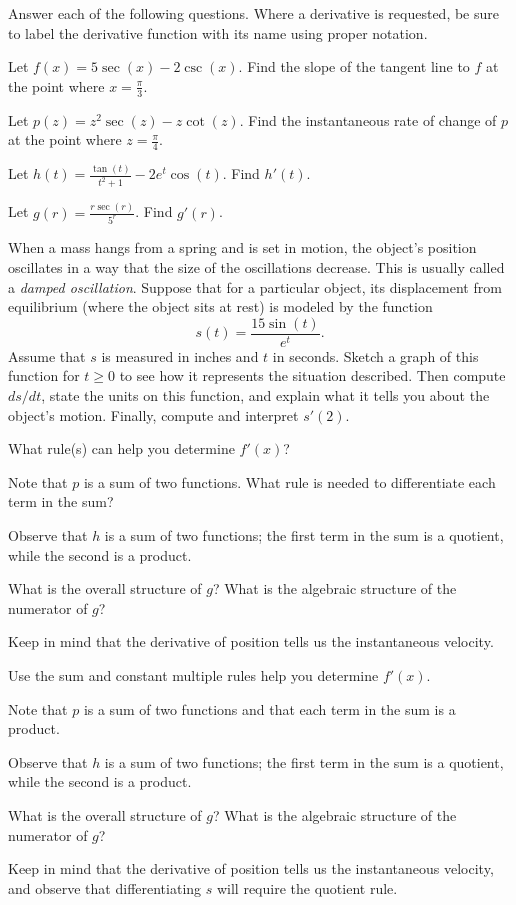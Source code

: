 \begin{activity} \label{A:2.5.7}  Answer each of the following questions.  Where a derivative is requested, be sure to label the derivative function with its name using proper notation.
\ba
	\item  Let $f(x) = 5 \sec(x) - 2\csc(x)$.  Find the slope of the tangent line to $f$ at the point where $x =\frac{\pi}{3}$.
	\item Let $p(z) = z^2\sec(z) - z\cot(z)$.  Find the instantaneous rate of change of $p$ at the point where $z = \frac{\pi}{4}$.
        \item Let $h(t) = \displaystyle \frac{\tan (t)}{t^2+1} - 2e^t \cos(t)$.  Find $h'(t)$.
        \item Let $g(r) = \displaystyle \frac{r \sec(r) }{5^r}$.  Find $g'(r)$.
        \item When a mass hangs from a spring and is set in motion, the object's position oscillates in a way that the size of the oscillations decrease.  This is usually called a \emph{damped oscillation}.  Suppose that for a particular object, its displacement from equilibrium (where the object sits at rest) is modeled by the function $$s(t) = \frac{15 \sin(t)}{e^t}.$$
Assume that $s$ is measured in inches and $t$ in seconds.  Sketch a graph of this function for $t \ge 0$ to see how it represents the situation described.  Then compute $ds/dt$, state the units on this function, and explain what it tells you about the object's motion.  Finally, compute and interpret $s'(2)$.
\ea
\end{activity}
\begin{smallhint}
\ba
	\item  What rule(s) can help you determine $f'(x)$?
	\item Note that $p$ is a sum of two functions.  What rule is needed to differentiate each term in the sum?
	\item Observe that $h$ is a sum of two functions; the first term in the sum is a quotient, while the second is a product.
        \item What is the overall structure of $g$?  What is the algebraic structure of the numerator of $g$?
        \item Keep in mind that the derivative of position tells us the instantaneous velocity.
\ea
\end{smallhint}
\begin{bighint}
\ba
	\item Use the sum and constant multiple rules help you determine $f'(x)$.
	\item Note that $p$ is a sum of two functions and that each term in the sum is a product.
	\item Observe that $h$ is a sum of two functions; the first term in the sum is a quotient, while the second is a product.
        \item What is the overall structure of $g$?  What is the algebraic structure of the numerator of $g$?
        \item Keep in mind that the derivative of position tells us the instantaneous velocity, and observe that differentiating $s$ will require the quotient rule.
\ea
\end{bighint}
